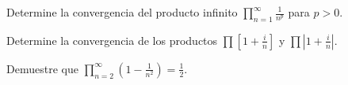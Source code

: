 \documentclass[12pt]{article}
\newenvironment{problem}[2][Problema]{\begin{trivlist}
\item[\hskip \labelsep {\bfseries #1}\hskip \labelsep {\bfseries #2.}]}{\end{trivlist}}
\begin{document}
\begin{problem}{5. pp. 173} Determine la convergencia del producto infinito $\prod_{n=1}^\infty \frac{1}{n^p}$ para $p > 0.$
\end{problem}

\begin{problem}{6. pp. 173} Determine la convergencia de los productos $\prod \left[ 1 + \frac{i}{n}\right]$ y $\prod \left|1 + \frac{i}{n} \right|$.
\end{problem}

\begin{problem}{7. pp. 173} Demuestre que $\prod_{n=2}^\infty \left(1-\frac{1}{n^2}\right) = \frac{1}{2}.$

\end{problem}
\printbibliography
\end{document}
